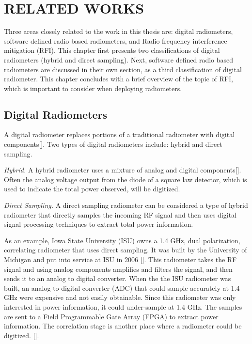 

\chapter{RELATED WORKS}\label{ch:relatedworks}

Three areas closely related to the work in this thesis are: digital radiometers, software defined radio based radiometers, and Radio frequency interference mitigation (RFI).  This chapter first presents two classifications of digital radiometers (hybrid and direct sampling).  Next, software defined radio based radiometers are discussed in their own section, as a third classification of digital radiometer.  This chapter concludes with a brief overview of the topic of RFI, which is important to consider when deploying radiometers.

\section{Digital Radiometers}

A digital radiometer replaces portions of a traditional radiometer with digital components[\cite{Ruf}].  Two types of digital radiometers include: hybrid and direct sampling.

\emph{Hybrid.}  A hybrid radiometer uses a mixture of  analog and digital components[\cite{skou}].  Often the analog voltage output from the diode of a square law detector, which is used to indicate the total power observed, will be digitized. 

\emph{Direct Sampling.}  A direct sampling radiometer can be considered a type of hybrid radiometer that directly samples the incoming RF signal and then uses digital signal processing techniques to extract total power information. 
  
As an example, Iowa State University (ISU) owns a 1.4 GHz, dual polarization, correlating radiometer that uses direct sampling.  It was built by the University of Michigan and put into service at ISU in 2006 [\cite{Erbas}].  This radiometer takes the RF signal and using analog components amplifies and filters the signal, and then sends it to an analog to digital converter.  When the  the ISU radiometer was built, an analog to digital converter (ADC) that could sample accurately at 1.4 GHz were expensive and not easily obtainable.  Since this radiometer was only interested in power information, it could under-sample at 1.4 GHz.  The samples are sent to a Field Programmable Gate Array (FPGA) to extract power information.  The correlation stage is another place where a radiometer could be digitized.  [\cite{Fischman2001}]. 

